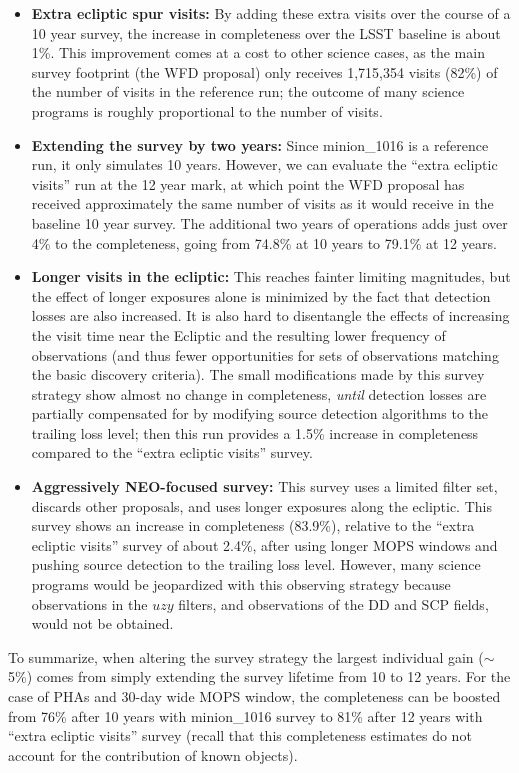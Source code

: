 \begin{itemize}
\item \textbf{Extra ecliptic spur visits:} By adding these extra visits over the course of a 10 year survey, the increase in completeness over the LSST baseline is about 1\%. This improvement comes at a cost to other science cases, as the main survey footprint (the WFD proposal) only receives 1,715,354 visits (82\%) of the number of visits in the reference run; the outcome of many science programs is roughly proportional to the number of visits.
\item \textbf{Extending the survey by two years:} Since minion\_1016 is a reference run, it only simulates 10 years.
However, we can evaluate the ``extra ecliptic visits'' run at the 12 year mark, at which point the WFD proposal has received approximately the same number of visits as it would receive in the baseline 10 year survey. The additional two years of operations adds just over 4\% to the completeness, going from 74.8\% at 10 years to 79.1\% at 12 years.
\item \textbf{Longer visits in the ecliptic:} This reaches fainter limiting magnitudes, but the effect of longer exposures alone is minimized by the fact that detection losses are also increased. It is also hard to disentangle the effects of increasing the visit time near the Ecliptic and the resulting lower frequency of observations (and thus fewer opportunities for sets of observations matching the basic discovery criteria). The small modifications made by this survey strategy show almost no change in completeness, {\it until} detection losses are partially compensated for by modifying source detection algorithms to the trailing loss level; then this run provides a 1.5\% increase in completeness compared to the ``extra ecliptic visits'' survey.
\item \textbf{Aggressively NEO-focused survey:} This survey uses a limited filter set, discards other proposals, and uses longer exposures along the ecliptic. This survey shows an increase in completeness (83.9\%), relative to the ``extra ecliptic visits'' survey of about 2.4\%, after using longer MOPS windows and pushing source detection to the trailing loss level.
However, many science programs would be jeopardized with this observing strategy because observations in the $uzy$ filters,
and observations of the DD and SCP fields, would not be obtained.
\end{itemize}

To summarize, when altering the survey strategy the largest individual gain ($\sim$5\%)
comes from simply extending the survey lifetime from 10 to 12 years. For the case of PHAs and 30-day wide MOPS window,
the completeness can be boosted from 76\% after 10 years with minion\_1016 survey to 81\% after 12 years with
``extra ecliptic visits'' survey (recall that this completeness estimates do not account for the contribution of known objects).



